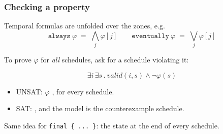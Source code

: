 \begin{frame}
  \frametitle{Checking a property} \small

Temporal formulas are unfolded over the zones, e.g.
\[
\mathtt{always}\ \varphi \;=\; \bigwedge_j \varphi[j]
\qquad
\mathtt{eventually}\ \varphi \;=\; \bigvee_j \varphi[j]
\]

\vspace{0.2cm}
To prove $\varphi$ for {\em all} schedules, ask \zthree{} for a schedule violating it:

\[
\exists i\, \exists s\, .\ \mathit{valid}(i,s) \wedge \neg\varphi(s)
\]

\vspace{0.2cm}
\begin{itemize}
\item UNSAT: $\varphi$ \holds{}, for every schedule.
\item SAT: \violated{}, and the model is the counterexample schedule.
\end{itemize}

\vspace{0.2cm}
Same idea for {\tt final \{ ... \}}: the state at the end of every schedule.

\end{frame}
